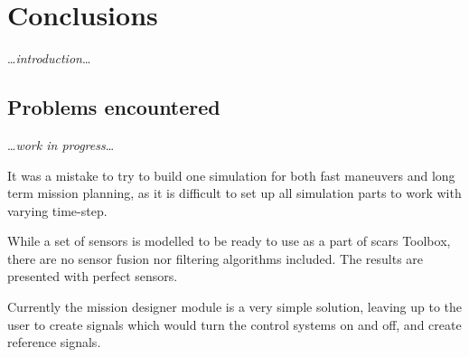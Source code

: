 \section{Conclusions}\label{sec:conclusions}
    \dots\textit{introduction}\dots

    \subsection{Problems encountered}
        \dots\textit{work in progress}\dots

        It was a mistake to try to build one simulation for both fast maneuvers and long term mission planning, as it is difficult to set up all simulation parts to work with varying time-step.

        While a set of sensors is modelled to be ready to use as a part of \ac{scars} Toolbox, there are no sensor fusion nor filtering algorithms included. The results are presented with perfect sensors.

        Currently the mission designer module is a very simple solution, leaving up to the user to create signals which would turn the control systems on and off, and create reference signals.